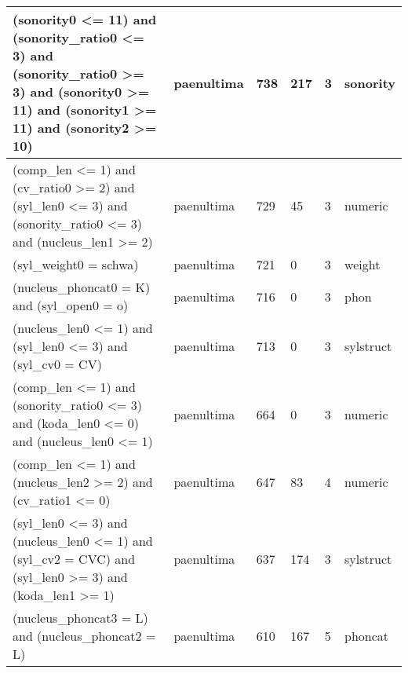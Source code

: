 \begin{table}
\begin{tabular}{|p{8cm}l|ll|ll|}
(sonority0 \textless= 11) and (sonority\_ratio0 \textless= 3) and (sonority\_ratio0 \textgreater= 3) and (sonority0 \textgreater= 11) and (sonority1 \textgreater= 11) and (sonority2 \textgreater= 10)      & paenultima & 738  & 217 & 3 & sonority  \\\hline
(comp\_len \textless= 1) and (cv\_ratio0 \textgreater= 2) and (syl\_len0 \textless= 3) and (sonority\_ratio0 \textless= 3) and (nucleus\_len1 \textgreater= 2)                                               & paenultima & 729  & 45  & 3 & numeric   \\\hline
(syl\_weight0 = schwa)                                                                                                                                                                                       & paenultima & 721  & 0   & 3 & weight    \\\hline
(nucleus\_phoncat0 = K) and (syl\_open0 = o)                                                                                                                                                                 & paenultima & 716  & 0   & 3 & phon      \\\hline
(nucleus\_len0 \textless= 1) and (syl\_len0 \textless= 3) and (syl\_cv0 = CV)                                                                                                                                & paenultima & 713  & 0   & 3 & sylstruct \\\hline
(comp\_len \textless= 1) and (sonority\_ratio0 \textless= 3) and (koda\_len0 \textless= 0) and (nucleus\_len0 \textless= 1)                                                                                  & paenultima & 664  & 0   & 3 & numeric   \\\hline
(comp\_len \textless= 1) and (nucleus\_len2 \textgreater= 2) and (cv\_ratio1 \textless= 0)                                                                                                                   & paenultima & 647  & 83  & 4 & numeric   \\\hline
(syl\_len0 \textless= 3) and (nucleus\_len0 \textless= 1) and (syl\_cv2 = CVC) and (syl\_len0 \textgreater= 3) and (koda\_len1 \textgreater= 1)                                                              & paenultima & 637  & 174 & 3 & sylstruct \\\hline
(nucleus\_phoncat3 = L) and (nucleus\_phoncat2 = L)                                                                                                                                                          & paenultima & 610  & 167 & 5 & phoncat   \\\hline

\end{tabular}
\end{table}

